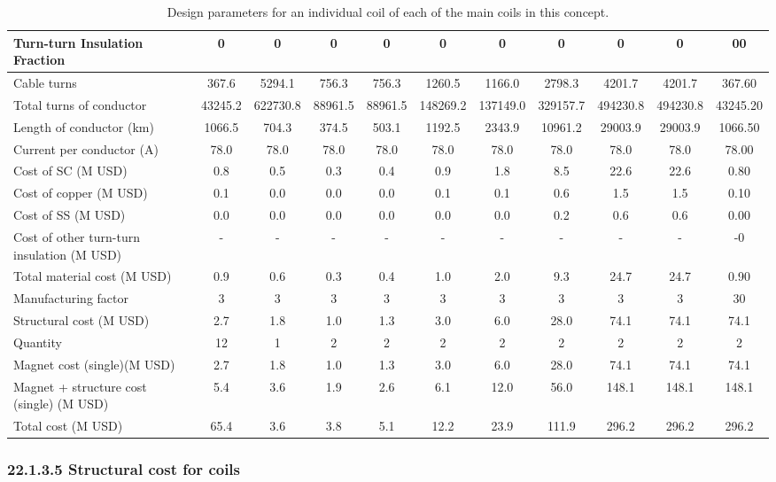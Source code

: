 \begin{table}[h]
{\begin{tabular}{lcccccccccc}
Turn-turn Insulation Fraction & 0 & 0 & 0 & 0 & 0 & 0 & 0 & 0 & 0 & 00 \\
\hline
Cable turns & 367.6 & 5294.1 & 756.3 & 756.3 & 1260.5 & 1166.0 & 2798.3 & 4201.7 & 4201.7 & 367.60 \\
Total turns of conductor & 43245.2 & 622730.8 & 88961.5 & 88961.5 & 148269.2 & 137149.0 & 329157.7 & 494230.8 & 494230.8 & 43245.20 \\
Length of conductor (km) & 1066.5 & 704.3 & 374.5 & 503.1 & 1192.5 & 2343.9 & 10961.2 & 29003.9 & 29003.9 & 1066.50 \\
Current per conductor (A) & 78.0 & 78.0 & 78.0 & 78.0 & 78.0 & 78.0 & 78.0 & 78.0 & 78.0 & 78.00 \\
\hline
Cost of SC (M USD) & 0.8 & 0.5 & 0.3 & 0.4 & 0.9 & 1.8 & 8.5 & 22.6 & 22.6 & 0.80 \\
Cost of copper (M USD) & 0.1 & 0.0 & 0.0 & 0.0 & 0.1 & 0.1 & 0.6 & 1.5 & 1.5 & 0.10 \\
Cost of SS (M USD) & 0.0 & 0.0 & 0.0 & 0.0 & 0.0 & 0.0 & 0.2 & 0.6 & 0.6 & 0.00 \\
Cost of other turn-turn insulation (M USD) & - & - & - & - & - & - & - & - & - & -0 \\
Total material cost (M USD) & 0.9 & 0.6 & 0.3 & 0.4 & 1.0 & 2.0 & 9.3 & 24.7 & 24.7 & 0.90 \\
Manufacturing factor & 3 & 3 & 3 & 3 & 3 & 3 & 3 & 3 & 3 & 30 \\
Structural cost (M USD) & 2.7 & 1.8 & 1.0 & 1.3 & 3.0 & 6.0 & 28.0 & 74.1 & 74.1 & 74.1 \\
Quantity & 12 & 1 & 2 & 2 & 2 & 2 & 2 & 2 & 2 & 2 \\
Magnet cost (single)(M USD) & 2.7 & 1.8 & 1.0 & 1.3 & 3.0 & 6.0 & 28.0 & 74.1 & 74.1 & 74.1 \\
Magnet + structure cost (single) (M USD) & 5.4 & 3.6 & 1.9 & 2.6 & 6.1 & 12.0 & 56.0 & 148.1 & 148.1 & 148.1 \\
\hline
Total cost (M USD) & 65.4 & 3.6 & 3.8 & 5.1 & 12.2 & 23.9 & 111.9 & 296.2 & 296.2 & 296.2 \\
\hline
\end{tabular}}
\caption{Design parameters for an individual coil of each of the main coils in this concept.}
\label{your-table-label}
\end{table}


\subsubsection*{22.1.3.5 Structural cost for coils}

